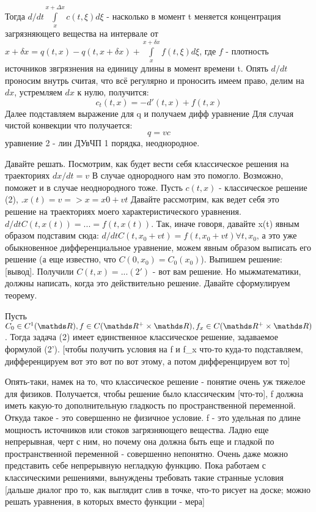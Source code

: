 Тогда $d/dt \int \limits_x^{x + \Delta x} c(t, \xi ) d \xi$ - насколько в момент t меняется концентрация загрязняющего вещества на интервале от $x + \delta x = q(t, x) - q(t, x + \delta x) + \int \limits_x^{x+\delta x} f(t,\xi) d\xi$, где $f$ - плотность источников звгрязнения на единицу длины в момент времени t.
Опять $d/dt$ проносим внутрь считая, что всё регулярно и проносить имеем право, делим на $dx$, устремляем $dx$ к нулю, получится:
$$c_t(t,x) = -d'(t,x) + f(t, x)$$
Далее подставляем выражение для q и получаем дифф уравнение
Для случая чистой конвекции что получается:
$$q = vc$$
уравнение 2 - лин ДУвЧП 1 порядка, неоднородное.

Давайте решать. Посмотрим, как будет вести себя классическое решения на траекториях $dx/dt = v$
В случае однородного нам это помогло. Возможно, поможет и в случае неоднородного тоже.
Пусть $c(t,x)$ - классическое решение (2), .$x(t) = v => x = x0 + vt$
Давайте рассмотрим, как ведет себя это решение на траекториях моего характеристического уравнения. $d/dt C(t, x(t)) = ... = f (t, x(t))$. Так, иначе говоря, давайте x(t) явным образом подставим сюда: $d/dt C(t, x_0 + vt) = f(t, x_0 + vt) \forall t, x_0$, а это уже обыкновенное дифференциальное уравнение, можем явным образом выписать его решение (а еще известно, что $C(0, x_0) = C_0(x_0)$). Выпишем решение: [вывод]. Получили $C(t, x) = ... (2')$ - вот вам решение. Но мыжматематики, должны написать, когда это действительно решение. Давайте сформулируем теорему.

\begin{theorem}
Пусть $C_0 \in C^1(\real), f \in C(\real^+ \times \real), f_x \in C(\real^+ \times \real)$. Тогда задача (2) имеет единственное классическое решение, задаваемое формулой (2'). [чтобы получить условия на f и f_x что-то куда-то подставляем, дифференцируем вот это вот по вот этому, а потом дифференцируем вот то]
\end{theorem}

Опять-таки, намек на то, что классическое решение - понятие очень уж тяжелое для физиков. Получается, чтобы решение было классическим [что-то], f должна иметь какую-то дополнительную гладкость по пространственной переменной. Откуда такое - это совершенно не физичное условие. f - это удельная по длине мощность источников или стоков загрязняющего вещества. Ладно еще непрерывная, черт с ним, но почему она должна быть еще и гладкой по пространственной переменной - совершенно непонятно. Очень даже можно представить себе непрерывную негладкую функцию. Пока работаем с классическими решениями, вынуждены требовать такие странные условия [дальше диалог про то, как выглядит слив в точке, что-то рисует на доске; можно решать уравнения, в которых вместо функции - мера]